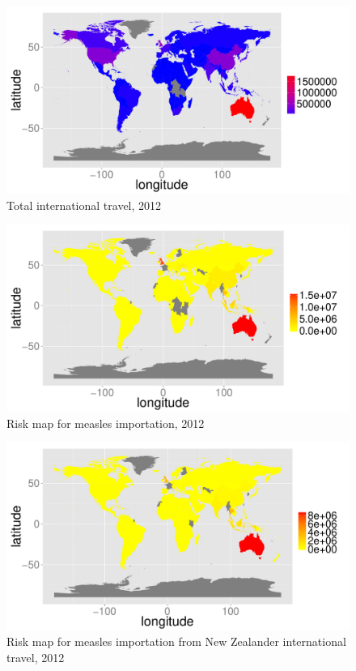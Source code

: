 \documentclass{article}
\begin{document}
\begin{figure}
\begin{center}
\includegraphics{draftfinalreport_v2-051}
\end{center}
\caption{Total international travel, 2012 }
\label{fig:travel12}
\end{figure}

\begin{figure}
\begin{center}
\includegraphics{draftfinalreport_v2-052}
\end{center}
\caption{Risk map for measles importation, 2012 }
\label{fig:risk12}
\end{figure}

\begin{figure}
\begin{center}
\includegraphics{draftfinalreport_v2-053}
\end{center}
\caption{Risk map for measles importation from New Zealander international travel, 2012 }
\label{fig:nzrisk12}
\end{figure}
\end{document}
